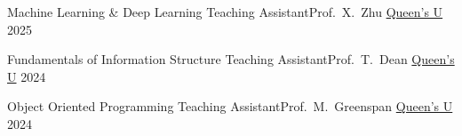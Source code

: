 \newcommand{\taprefix}{Teaching Assistant{\enskip\cdotp\enskip}}

\begin{cvhonors}

  \cvhonor
    {Machine Learning \& Deep Learning} %
    {\taprefix Prof.~X.~Zhu} %
    {\href{https://www.queensu.ca/}{Queen's U}} %
    {2025} %

  \cvhonor
    {Fundamentals of Information Structure} %
    {\taprefix Prof.~T.~Dean} %
    {\href{https://www.queensu.ca/}{Queen's U}} %
    {2024} %

  \cvhonor
    {Object Oriented Programming} %
    {\taprefix Prof.~M.~Greenspan} %
    {\href{https://www.queensu.ca/}{Queen's U}} %
    {2024} %








\end{cvhonors}
